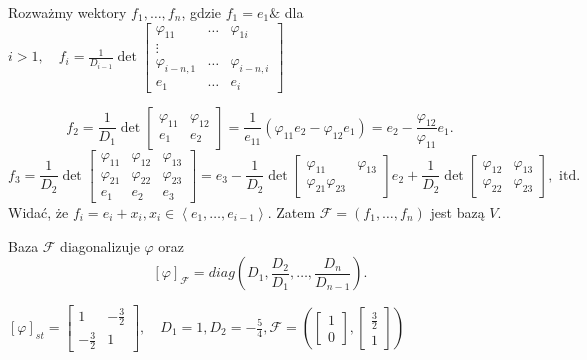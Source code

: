 \documentclass[../main.tex]{subfiles}
\begin{document}
    Rozważmy wektory $f_1,\ldots,f_n$, gdzie $f_1 = e_1 \&$ dla $i>1,\quad f_i = \frac{1}{D_{i-1}} \det \begin{bmatrix} \varphi_{11}&\ldots&\varphi_{1i}\\ \vdots \\ \varphi_{i-n, 1}&\ldots&\varphi_{i-n, i}\\ e_1& \ldots& e_i \end{bmatrix}$
    \begin{przyklad}
        \[
            f_2 = \frac{1}{D_1} \det \begin{bmatrix} \varphi_{11}&\varphi_{12}\\e_1&e_2 \end{bmatrix} = \frac{1}{e_{11}}(\varphi_{11}e_2 - \varphi_{12}e_1) = e_2 - \frac{\varphi_{12}}{\varphi_{11}}e_1
        .\]
        \[
            f_3 = \frac{1}{D_2} \det \begin{bmatrix} \varphi_{11}&\varphi_{12}&\varphi_{13}\\\varphi_{21}&\varphi_{22}&\varphi_{23}\\e_1&e_2&e_3 \end{bmatrix} = e_3 - \frac{1}{D_2} \det \begin{bmatrix} \varphi_{11}&\varphi_{13}\\\varphi_{21}\varphi_{23} \end{bmatrix} e_2 + \frac{1}{D_2}\det \begin{bmatrix} \varphi_{12}&\varphi_{13}\\\varphi_{22}&\varphi_{23} \end{bmatrix}, \text{ itd.}
        \]
    Widać, że $f_i = e_i + x_i, x_i\in \left< e_1,\ldots,e_{i-1}\right>$. Zatem $\mathcal{F} = \left( f_1,\ldots,f_n \right) $ jest bazą $V$.
    \end{przyklad}
    \begin{tw}
        Baza $\mathcal{F}$ diagonalizuje $\varphi$ oraz
        \[
         \left[ \varphi \right] _\mathcal{F} = diag \left( D_1, \frac{D_2}{D_1},\ldots, \frac{D_n}{D_{n-1}} \right)
        .\]
    \end{tw}
    \begin{przyklad}
        $\left[ \varphi \right] _{st} = \begin{bmatrix} 1&-\frac{3}{2}\\ -\frac{3}{2}&1 \end{bmatrix} ,\quad D_1 = 1, D_2 = -\frac{5}{4}, \mathcal{F} = \left( \begin{bmatrix} 1\\0 \end{bmatrix} , \begin{bmatrix} \frac{3}{2}\\1 \end{bmatrix}  \right) $
    \end{przyklad}
\end{document}
